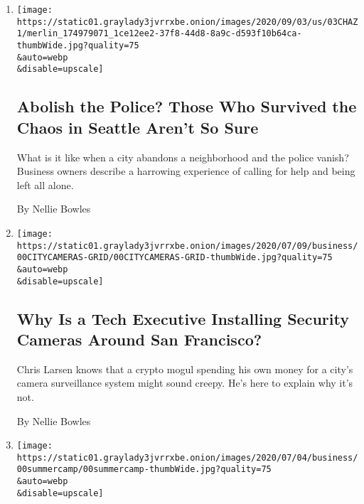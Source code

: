 \begin{enumerate}
\def\labelenumi{\arabic{enumi}.}
\item
  \href{/2020/08/07/us/defund-police-seattle-protests.html}{}

  \texttt{[image: https://static01.graylady3jvrrxbe.onion/images/2020/09/03/us/03CHAZ1/merlin\_174979071\_1ce12ee2-37f8-44d8-8a9c-d593f10b64ca-thumbWide.jpg?quality=75\\\&auto=webp\\\&disable=upscale]}

  \hypertarget{abolish-the-police-those-who-survived-the-chaos-in-seattle-arent-so-sure}{%
  \subsection{Abolish the Police? Those Who Survived the Chaos in
  Seattle Aren't So
  Sure}\label{abolish-the-police-those-who-survived-the-chaos-in-seattle-arent-so-sure}}

  What is it like when a city abandons a neighborhood and the police
  vanish? Business owners describe a harrowing experience of calling for
  help and being left all alone.

  By Nellie Bowles
\item
  \href{/2020/07/10/business/camera-surveillance-san-francisco.html}{}

  \texttt{[image: https://static01.graylady3jvrrxbe.onion/images/2020/07/09/business/00CITYCAMERAS-GRID/00CITYCAMERAS-GRID-thumbWide.jpg?quality=75\\\&auto=webp\\\&disable=upscale]}

  \hypertarget{why-is-a-tech-executive-installing-security-cameras-around-san-francisco}{%
  \subsection{Why Is a Tech Executive Installing Security Cameras Around
  San
  Francisco?}\label{why-is-a-tech-executive-installing-security-cameras-around-san-francisco}}

  Chris Larsen knows that a crypto mogul spending his own money for a
  city's camera surveillance system might sound creepy. He's here to
  explain why it's not.

  By Nellie Bowles
\item
  \href{/2020/07/04/technology/virtual-summer-camps-pandemic.html}{}

  \texttt{[image: https://static01.graylady3jvrrxbe.onion/images/2020/07/04/business/00summercamp/00summercamp-thumbWide.jpg?quality=75\\\&auto=webp\\\&disable=upscale]}


\end{enumerate}
